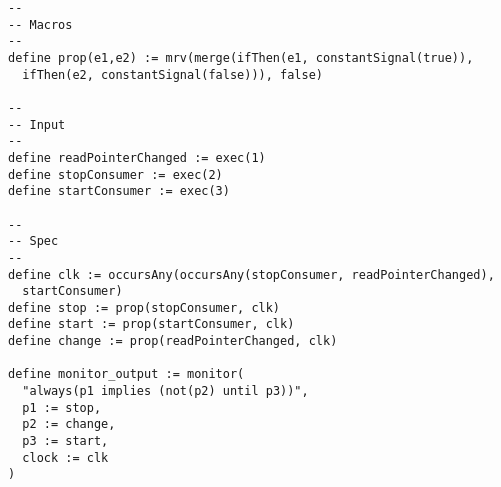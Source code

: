 \documentclass{article}
\begin{document}
\begin{lstlisting}[language=tessla+salt]
--
-- Macros
--
define prop(e1,e2) := mrv(merge(ifThen(e1, constantSignal(true)),
  ifThen(e2, constantSignal(false))), false)

--
-- Input
--
define readPointerChanged := exec(1)
define stopConsumer := exec(2)
define startConsumer := exec(3)

--
-- Spec
--
define clk := occursAny(occursAny(stopConsumer, readPointerChanged),
  startConsumer)
define stop := prop(stopConsumer, clk)
define start := prop(startConsumer, clk)
define change := prop(readPointerChanged, clk)

define monitor_output := monitor(
  "always(p1 implies (not(p2) until p3))",
  p1 := stop,
  p2 := change,
  p3 := start,
  clock := clk
)
\end{lstlisting}
\end{document}
